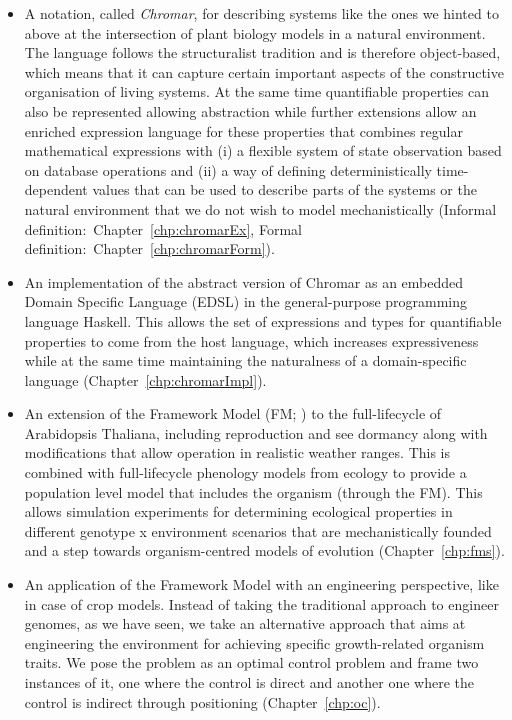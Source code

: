 \begin{itemize}
\item A notation, called \emph{Chromar}, for describing systems like the ones
  we hinted to above at the intersection of plant biology models in a natural
  environment. The language follows the structuralist tradition and is therefore
  object-based, which means that it can capture certain important aspects of the
  constructive organisation of living systems. At the same time quantifiable
  properties can also be represented allowing abstraction while further
  extensions allow an enriched expression language for these properties that
  combines regular mathematical expressions with (i) a flexible system of state
  observation based on database operations and (ii) a way of defining
  deterministically time-dependent values that can be used to describe parts of
  the systems or the natural environment that we do not wish to model
  mechanistically (Informal definition:~Chapter~\ref{chp:chromarEx}, Formal
  definition:~Chapter~\ref{chp:chromarForm}).
\item An implementation of the abstract version of Chromar as an embedded Domain
  Specific Language (EDSL) in the general-purpose programming language
  Haskell. This allows the set of expressions and types for quantifiable
  properties to come from the host language, which increases expressiveness
  while at the same time maintaining the naturalness of a domain-specific
  language (Chapter~\ref{chp:chromarImpl}).
\item An extension of the Framework Model (FM; ) to the full-lifecycle
  of Arabidopsis Thaliana, including reproduction and see dormancy along with
  modifications that allow operation in realistic weather ranges. This is
  combined with full-lifecycle phenology models from ecology to provide a
  population level model that includes the organism (through the FM). This
  allows simulation experiments for determining ecological properties in
  different genotype x environment scenarios that are mechanistically founded
  and a step towards organism-centred models of evolution
  (Chapter~\ref{chp:fms}).
\item An application of the Framework Model with an engineering perspective,
  like in case of crop models. Instead of taking the traditional approach to
  engineer genomes, as we have seen, we take an alternative approach that aims
  at engineering the environment for achieving specific growth-related organism
  traits. We pose the problem as an optimal control problem and frame two
  instances of it, one where the control is direct and another one where the
  control is indirect through positioning (Chapter~\ref{chp:oc}).
\end{itemize}
